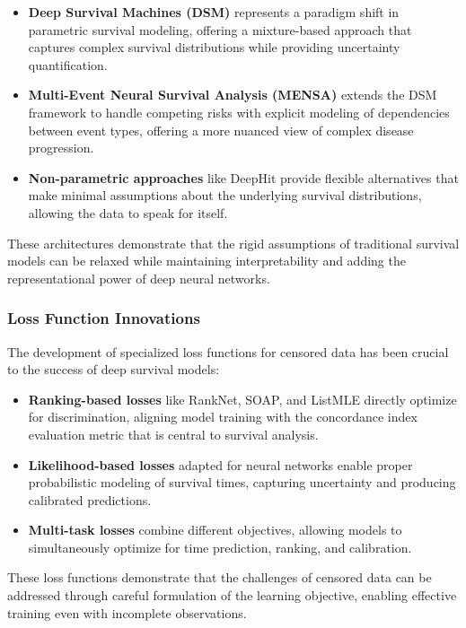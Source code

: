 \begin{itemize}
    \item \textbf{Deep Survival Machines (DSM)} represents a paradigm shift in parametric survival modeling, offering a mixture-based approach that captures complex survival distributions while providing uncertainty quantification.

    \item \textbf{Multi-Event Neural Survival Analysis (MENSA)} extends the DSM framework to handle competing risks with explicit modeling of dependencies between event types, offering a more nuanced view of complex disease progression.

    \item \textbf{Non-parametric approaches} like DeepHit provide flexible alternatives that make minimal assumptions about the underlying survival distributions, allowing the data to speak for itself.
\end{itemize}

These architectures demonstrate that the rigid assumptions of traditional survival models can be relaxed while maintaining interpretability and adding the representational power of deep neural networks.

\subsubsection{Loss Function Innovations}

The development of specialized loss functions for censored data has been crucial to the success of deep survival models:

\begin{itemize}
    \item \textbf{Ranking-based losses} like RankNet, SOAP, and ListMLE directly optimize for discrimination, aligning model training with the concordance index evaluation metric that is central to survival analysis.

    \item \textbf{Likelihood-based losses} adapted for neural networks enable proper probabilistic modeling of survival times, capturing uncertainty and producing calibrated predictions.

    \item \textbf{Multi-task losses} combine different objectives, allowing models to simultaneously optimize for time prediction, ranking, and calibration.
\end{itemize}

These loss functions demonstrate that the challenges of censored data can be addressed through careful formulation of the learning objective, enabling effective training even with incomplete observations.


